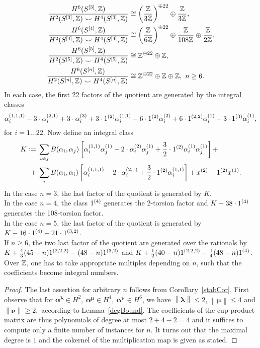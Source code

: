 \begin{proposition}
\begin{align} 
\frac{H^6(S^{[3]},\mathbb{Z})}{H^2(S^{[3]},\mathbb{Z})\smile H^4(S^{[3]},\mathbb{Z})} &\cong \left(\frac{\mathbb{Z}}{3\mathbb{Z}}\right)^{\oplus 22} \oplus \frac{\mathbb{Z}}{3\mathbb{Z}},
\\
\frac{H^6(S^{[4]},\mathbb{Z})}{H^2(S^{[4]},\mathbb{Z})\smile H^4(S^{[4]},\mathbb{Z})} &\cong  \left(\frac{\mathbb{Z}}{6\mathbb{Z}}\right)^{\oplus 22}\oplus\frac{\mathbb{Z}}{108\mathbb{Z}} \oplus\frac{\mathbb{Z}}{2\mathbb{Z}} ,
\\
\frac{H^6(S^{[5]},\mathbb{Z})}{H^2(S^{[5]},\mathbb{Z})\smile H^4(S^{[5]},\mathbb{Z})} &\cong 
 \mathbb{Z}^{\oplus 22} \oplus \mathbb{Z},
\\
\frac{H^6(S^{[n]},\mathbb{Z})}{H^2(S^{[n]},\mathbb{Z})\smile H^4(S^{[n]},\mathbb{Z})} &\cong 
 \mathbb{Z}^{\oplus 22} \oplus \mathbb{Z}\oplus\mathbb{Z}, \ n\geq 6.
\end{align}
In each case, the first 22 factors of the quotient are generated by the integral classes 
 $$
\alpha_i^{(1,1,1)} -3\cdot \alpha_i^{(2,1)} + 3\cdot \alpha_i^{(3)}+ 3 \cdot 1^{(2)}\alpha_i^{(1,1)} -6\cdot 1^{(2)}\alpha_i^{(2)}+6\cdot 1^{(2,2)}\alpha_i^{(1)}-3\cdot 1^{(3)}\alpha_i^{(1)},
$$ 
for $ i=1\ldots 22$. Now define an integral class
\begin{align*}
K\vcentcolon= &\;\sum_{i\neq j} B(\alpha_i,\alpha_j)\left[\alpha_i^{(1,1)}\alpha_j^{(1)} - 2\cdot\alpha_i^{(2)}\alpha_j^{(1)}+\frac{3}{2}\cdot 1^{(2)}\alpha_i^{(1)}\alpha_j^{(1)} \right] +\\
+&\;\sum_{i}B(\alpha_i,\alpha_i)\left[\alpha_i^{(1,1,1)} - 2\cdot\alpha_i^{(2,1)} + \frac{3}{2}\cdot 1^{(2)}\alpha_i^{(1,1)} \right]+  x^{(2)}-1^{(2)}x^{(1)}.
\end{align*} 
In the case $n=3$, the last factor of the quotient is generated by $K$. 
\\In the case $n=4$, the class $ 1^{(4)}$ generates the 2-torsion factor and $K-38\cdot1^{(4)}$ generates the 108-torsion factor.
\\In the case $n=5$, the last factor of the quotient is generated by $K - 16\cdot 1^{(4)} + 21\cdot 1^{(3,2)}$.\\
If $n\geq 6$, the two last factor of the quotient are generated over the rationals by $K +\frac{4}{3}(45-n)1^{(2,2,2)} - (48-n)1^{(3,2)}$ and $K+\frac{1}{2}(40-n)1^{(2,2,2)}- \frac{1}{4}(48-n)1^{(4)}$. Over $\mathbb{Z}$, one has to take appropriate multiples depending on $n$, such that the coefficients become integral numbers.
\end{proposition}
\begin{proof} The last assertion for arbitrary $n$ follows from Corollary~\ref{stabCor}. First observe that for $\boldsymbol{\alpha}^{\boldsymbol{\lambda}}\!\in\! H^2,\  \boldsymbol{\alpha}^{\boldsymbol{\mu}}\!\in\! H^4,\  \boldsymbol{\alpha}^{\boldsymbol{\nu}}\!\in\! H^6 $, we have $\left\| \boldsymbol\lambda\right\| \leq 2$, $\left\| \boldsymbol\mu\right\| \leq 4$ and $\left\| \boldsymbol\nu\right\| \geq 2,$ according to Lemma~\ref{degBound}.
The coefficients of the cup product matrix are thus polynomials of degree at most $2+4-2 =4$ and it suffices to compute only a finite number of instances for $n$. It turns out that the maximal degree is $1$ and the cokernel of the multiplication map is given as stated.
\end{proof}

